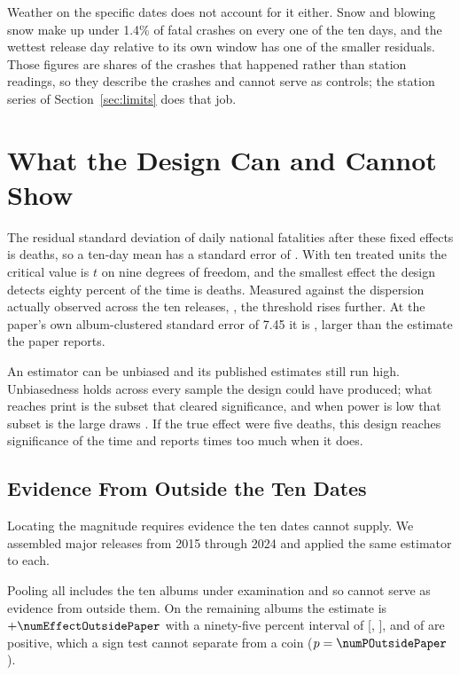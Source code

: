 \documentclass[11pt]{article}
\begin{document}
Weather on the specific dates does not account for it either. Snow and blowing snow make up under
1.4\% of fatal crashes on every one of the ten days, and the wettest release day relative to its
own window has one of the smaller residuals. Those figures are shares of the crashes that happened rather
than station readings, so they describe the crashes and cannot serve as controls; the station
series of Section~\ref{sec:limits} does that job.

\section{What the Design Can and Cannot Show}
\label{sec:design}

The residual standard deviation of daily national fatalities after these fixed effects is
\numResidSD{} deaths, so a ten-day mean has a standard error of \numSENull{}. With ten treated
units the critical value is $t$ on nine degrees of freedom, and the smallest effect the design
detects eighty percent of the time is \numMDEEighty{} deaths. Measured against the dispersion
actually observed across the ten releases, \numSERealized{}, the threshold rises further. At the
paper's own album-clustered standard error of 7.45 it is \numMDEEightyClustered{}, larger than the
estimate the paper reports.



An estimator can be unbiased and its published estimates still run high. Unbiasedness holds across
every sample the design could have produced; what reaches print is the subset that cleared
significance, and when power is low that subset is the large draws \citep{gelman2014beyond}. If
the true effect were five deaths, this design reaches significance
\numPowerAtFive{} of the time and reports \numExaggerationAtFive{} times too much when it does.

\subsection{Evidence From Outside the Ten Dates}

Locating the magnitude requires evidence the ten dates cannot supply. We assembled
\numNAllAlbums{} major releases from 2015 through 2024 and applied the same estimator to each.



Pooling all \numNAllAlbums{} includes the ten albums under examination and so cannot serve as
evidence from outside them. On the \numNOutsidePaper{} remaining albums the estimate is
$+\numEffectOutsidePaper$ with a ninety-five percent interval of [\numCIOutsideLo,
\numCIOutsideHi], and \numNPositiveOutside{} of \numNOutsidePaper{} are positive, which a sign test
cannot separate from a coin ($p = \numPOutsidePaper$).
\end{document}
